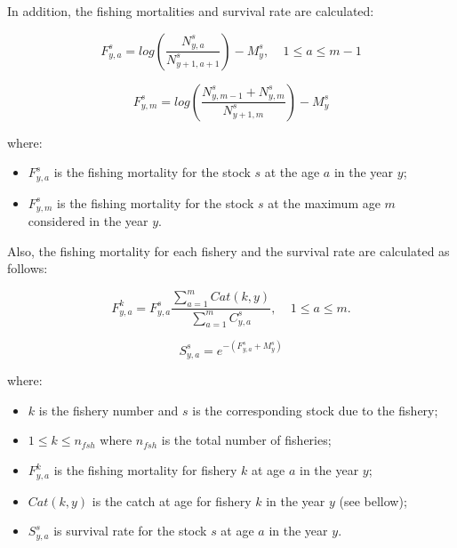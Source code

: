\documentclass{article}
\begin{document}
\hfill

In addition, the fishing mortalities and survival rate are calculated:

\begin{equation}
F^s_{y,a}=log\left(\dfrac{N^s_{y,a}}{N^s_{y+1,a+1}}\right)-M^s_y, \ \ \ \ \ 1\leq a \leq m-1
\end{equation}

\begin{equation}
F^s_{y,m}=log\left(\dfrac{N^s_{y,m-1}+N^s_{y,m}}{N^s_{y+1,m}}\right)-M^s_y
\end{equation}

where:

\begin{itemize}
    \item $F^s_{y,a}$ is the fishing mortality for the stock $s$ at the age $a$ in the year $y$;

    \item $F^s_{y,m}$ is the fishing mortality for the stock $s$ at the maximum age $m$ considered in the year $y$.
\end{itemize}

\hfill

Also, the fishing mortality for each fishery and the survival rate are calculated as follows:

\begin{equation}
F^k_{y,a}=F^s_{y,a} \dfrac{\sum_{a = 1} ^{m} Cat(k,y)}{\sum_{a=1} ^{m} C^s_{y,a}}, \ \ \ \ \ 1\leq a \leq m.
\end{equation}

\begin{equation}
S^s_{y,a}=e^{-(F^s_{y,a}+M^s_{y})}
\end{equation}

where:
\begin{itemize}
    \item $k$ is the fishery number and $s$ is the corresponding stock due to the fishery;
    
    \item $1\leq k \leq n_{fsh}$ where $n_{fsh}$ is the total number of fisheries;
   
    \item $F^k_{y,a}$ is the fishing mortality for fishery $k$ at age $a$ in the year $y$;

    \item $Cat(k,y)$ is the catch at age for fishery $k$ in the year $y$ (see bellow);
    
    \item $S^s_{y,a}$ is survival rate for the stock $s$ at age $a$ in the year $y$.
\end{itemize}
\end{document}
